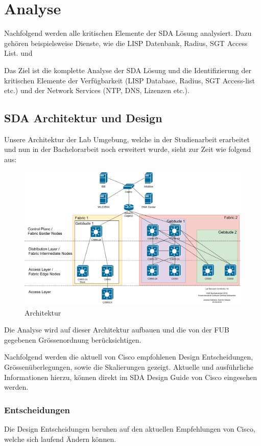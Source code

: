 \section{Analyse}
Nachfolgend werden alle kritischen Elemente der SDA Lösung analysiert. Dazu gehören beispielsweise Dienste, wie die LISP Datenbank, Radius, SGT Access List. und 

Das Ziel ist die komplette Analyse der SDA Lösung und die Identifizierung der kritischen Elemente der Verfügbarkeit (LISP Database, Radius, SGT Access-list etc.) und der Network Services (NTP, DNS, Lizenzen etc.).

\subsection{SDA Architektur und Design}
Unsere Architektur der Lab Umgebung, welche in der Studienarbeit erarbeitet und nun in der Bachelorarbeit noch erweitert wurde, sieht zur Zeit wie folgend aus:

\begin{figure}[H]
	\centering
	\includegraphics[width=1\linewidth]{img/Architecture/LabNetworkArchitecture-25-09}
	\caption{Architektur}
	\label{fig:Architektur}
\end{figure}

Die Analyse wird auf dieser Architektur aufbauen und die von der FUB gegebenen Grössenordnung berücksichtigen.

Nachfolgend werden die aktuell von Cisco empfohlenen Design Entscheidungen, Grössenüberlegungen, sowie die Skalierungen gezeigt. Aktuelle und ausführliche Informationen hierzu, können direkt im SDA Design Guide von Cisco \cite{sda-designguide} eingesehen werden. 

\subsubsection{Entscheidungen}
Die Design Entscheidungen beruhen auf den aktuellen Empfehlungen von Cisco, welche sich laufend Ändern können.

